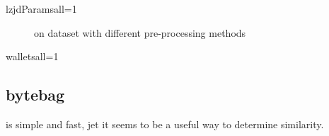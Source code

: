 \documentclass[../main.tex]{subfiles}
\begin{document}
\begin{sepTbl}{lzjdParams}{all}{=1}
  \caption{  and  on all codes from \n{\solcts}}
  \label{tbl:lz_solc_sep}
\end{sepTbl}

\begin{figure}[ht!]
  \centering
  \caption{ on  dataset with different pre-processing methods}
  \label{fig:hist_wallets_lzjd}
\end{figure}

\begin{sepTbl}{wallets}{all}{=1}
  \caption{  and  on all  codes}
  \label{tbl:lz_wall_sep}
\end{sepTbl}

\subsection{bytebag}
\begin{res}
   is simple and fast, jet it seems to be a useful way to determine similarity.
\end{res}
\end{document}
